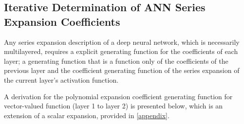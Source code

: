%
%
%
%
%
%

\subsection{Iterative Determination of ANN Series Expansion Coefficients}
{\color{red}
Any series expansion description of a deep neural network, which is necessarily multilayered, requires a explicit generating function for the coefficients of each layer; a generating function that is a function only of the coefficients of the previous layer and the coefficient generating function of the series expansion of the current layer's activation function.

A derivation for the polynomial expansion coefficient generating function for vector-valued function (layer 1 to layer 2) is presented below, which is an extension of a scalar expansion, provided in \ref{appendix}.}

